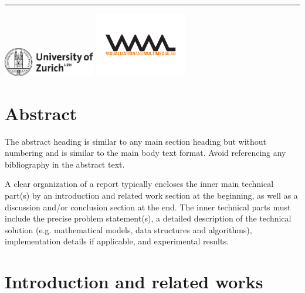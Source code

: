 \documentclass[11pt, a4paper,oneside,chapterprefix=false]{scrbook}
\begin{document}
\begin{titlepage}
	\vfill
	\hrule
	\vspace{0.5cm}
	\includegraphics*[width=0.3\textwidth]{figures/uzh_logo} \hfill
	\includegraphics*[width=0.3\textwidth]{figures/vmml_logo}
\end{titlepage}

\chapter{Abstract} \label{chp:abstract}

The abstract heading is similar to any main section heading but without numbering and is similar to the main body text format. Avoid referencing any bibliography in the abstract text.

A clear organization of a report typically encloses the inner main technical part(s) by an introduction and related work section at the beginning, as well as a discussion and/or conclusion section at the end. The inner technical parts must include the precise problem statement(s), a detailed description of the technical solution (e.g. mathematical models, data structures and algorithms), implementation details if applicable, and experimental results.


\tableofcontents

\mainmatter

\chapter{Introduction and related works} \label{chp:introduction}

\end{document}
